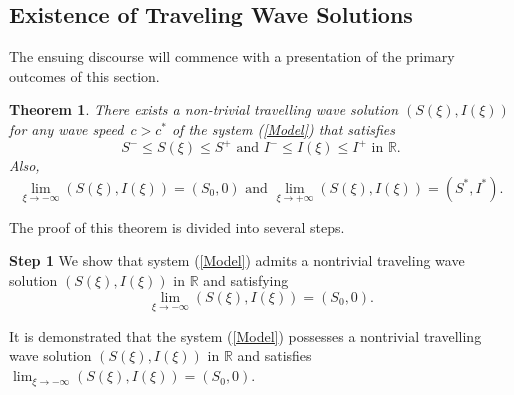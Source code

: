 \documentclass[final,3p,times]{elsarticle}
\newtheorem{theorem}{Theorem}[section]
\numberwithin{equation}{section}
\begin{document}
\subsection{Existence of Traveling Wave Solutions}
The ensuing discourse will commence with a presentation of the primary outcomes of this section.
\begin{theorem}
There exists a non-trivial travelling wave solution \((S(\xi), I(\xi))\) for any wave speed~\(c > c^*\) of the system (\ref{Model}) that satisfies
\[
S^-\leq S(\xi)\leq S^+ \text{ and } I^-\leq I(\xi)\leq I^+ \text{ in } \mathbb{R}.
\]
Also,
\[
\lim_{\xi\rightarrow -\infty}(S(\xi), I(\xi))=(S_0, 0) \text{ and } \lim_{\xi\rightarrow +\infty}(S(\xi), I(\xi))=(S^*, I^*).
\]
\end{theorem}
The proof of this theorem is divided into several steps.

\textbf{Step 1}
We show that system (\ref{Model}) admits a nontrivial traveling wave solution \((S(\xi), I(\xi))\) in \(\mathbb{R}\) and satisfying
\[
\lim_{\xi\rightarrow -\infty}(S(\xi), I(\xi))=(S_0, 0).
\]


It is demonstrated that the system (\ref{Model}) possesses a nontrivial travelling wave solution \((S(\xi), I(\xi))\) in \(\mathbb{R}\) and satisfies $\lim_{\xi\rightarrow -\infty}(S(\xi), I(\xi))=(S_0, 0).$
\end{document}
